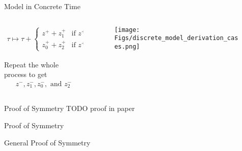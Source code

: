 \begin{frame}{Model in Concrete Time}
	\vspace{-1em}
	\begin{columns}
		\begin{column}{.5 \textwidth}
			\begin{align*}
				\tau \mapsto  \tau + \begin{cases}
					                     z^{+} + z_{1}^{+}     & \text{if } z^{+} \leq z_{0}^{+} \\
					                     z_{0}^{+} + z_{2}^{+} & \text{if } z^{+} > z_{0}^{+}
				                     \end{cases}
			\end{align*}
			\vspace{1em}

			Repeat the whole process to get
			\begin{align*}
				z^{-}, z_{1}^{-}, z_{0}^{-}, \text{ and } z_{2}^{-}
			\end{align*}
		\end{column}
		\begin{column}{.5 \textwidth}
			\begin{figure}
				\texttt{[image: Figs/discrete\_model\_derivation\_cases.png]}
			\end{figure}
		\end{column}
	\end{columns}

	\flushright{[Avrutin]}
\end{frame}

\begin{frame}{Proof of Symmetry}
	TODO proof in paper

	\flushright{[Zhusubaliyev]}
\end{frame}

\begin{frame}{Proof of Symmetry}
	\begin{figure}
	\end{figure}
\end{frame}
\begin{frame}{General Proof of Symmetry}


\end{frame}


